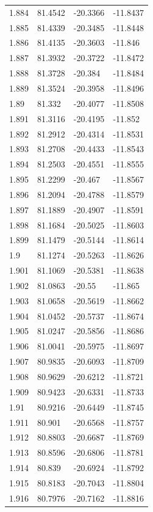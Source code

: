 \begin{tabular}{llll}
1.884 & 81.4542 & -20.3366 & -11.8437 \\
1.885 & 81.4339 & -20.3485 & -11.8448 \\
1.886 & 81.4135 & -20.3603 & -11.846 \\
1.887 & 81.3932 & -20.3722 & -11.8472 \\
1.888 & 81.3728 & -20.384 & -11.8484 \\
1.889 & 81.3524 & -20.3958 & -11.8496 \\
1.89 & 81.332 & -20.4077 & -11.8508 \\
1.891 & 81.3116 & -20.4195 & -11.852 \\
1.892 & 81.2912 & -20.4314 & -11.8531 \\
1.893 & 81.2708 & -20.4433 & -11.8543 \\
1.894 & 81.2503 & -20.4551 & -11.8555 \\
1.895 & 81.2299 & -20.467 & -11.8567 \\
1.896 & 81.2094 & -20.4788 & -11.8579 \\
1.897 & 81.1889 & -20.4907 & -11.8591 \\
1.898 & 81.1684 & -20.5025 & -11.8603 \\
1.899 & 81.1479 & -20.5144 & -11.8614 \\
1.9 & 81.1274 & -20.5263 & -11.8626 \\
1.901 & 81.1069 & -20.5381 & -11.8638 \\
1.902 & 81.0863 & -20.55 & -11.865 \\
1.903 & 81.0658 & -20.5619 & -11.8662 \\
1.904 & 81.0452 & -20.5737 & -11.8674 \\
1.905 & 81.0247 & -20.5856 & -11.8686 \\
1.906 & 81.0041 & -20.5975 & -11.8697 \\
1.907 & 80.9835 & -20.6093 & -11.8709 \\
1.908 & 80.9629 & -20.6212 & -11.8721 \\
1.909 & 80.9423 & -20.6331 & -11.8733 \\
1.91 & 80.9216 & -20.6449 & -11.8745 \\
1.911 & 80.901 & -20.6568 & -11.8757 \\
1.912 & 80.8803 & -20.6687 & -11.8769 \\
1.913 & 80.8596 & -20.6806 & -11.8781 \\
1.914 & 80.839 & -20.6924 & -11.8792 \\
1.915 & 80.8183 & -20.7043 & -11.8804 \\
1.916 & 80.7976 & -20.7162 & -11.8816 \\

\end{tabular}
